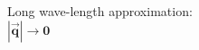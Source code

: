 \documentclass[preview]{standalone}
\begin{document}
\begin{center}
Long wave-length approximation:\\[0.2cm] $\boldsymbol{|\vec{q}|\rightarrow 0}$
\end{center}
\end{document}
